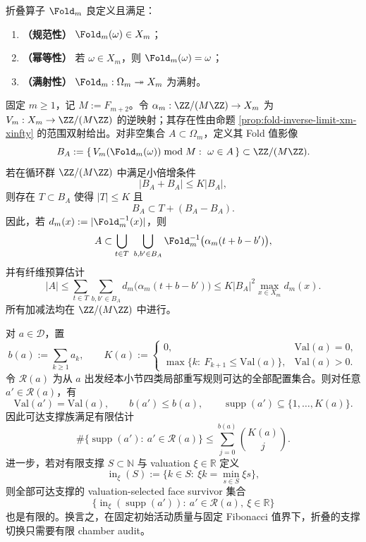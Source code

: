 \begin{proposition}\label{prop:fold-basic}
折叠算子 $\Fold_m$ 良定义且满足：
\begin{enumerate}
\normalfont
  \item \textbf{（规范性）} $\Fold_m(\omega)\in X_m$；
  \item \textbf{（幂等性）} 若 $\omega\in X_m$，则 $\Fold_m(\omega)=\omega$；
  \item \textbf{（满射性）} $\Fold_m:\Omega_m\twoheadrightarrow X_m$ 为满射。
\end{enumerate}
\end{proposition}
\begin{proposition}\label{prop:distill-fold-ruzsa-fiber-atlas}
固定 \(m\geq 1\)，记 \(M:=F_{m+2}\)。令
\(
\alpha_m:\ZZ/(M\ZZ)\to X_m
\)
为 \(V_m:X_m\to \ZZ/(M\ZZ)\) 的逆映射；其存在性由命题 \ref{prop:fold-inverse-limit-xm-xinfty} 的范围双射给出。对非空集合 \(A\subset\Omega_m\)，定义其 Fold 值影像
\[
B_A:=\{\,V_m(\Fold_m(\omega))\bmod M:\ \omega\in A\,\}\subset\ZZ/(M\ZZ).
\]
若在循环群 \(\ZZ/(M\ZZ)\) 中满足小倍增条件
\[
|B_A+B_A|\leq K|B_A|,
\]
则存在 \(T\subset B_A\) 使得 \(|T|\leq K\) 且
\[
B_A\subset T+(B_A-B_A).
\]
因此，若 \(d_m(x):=|\Fold_m^{-1}(x)|\)，则
\[
A\subset
\bigcup_{t\in T}\ \bigcup_{b,b'\in B_A}
\Fold_m^{-1}\bigl(\alpha_m(t+b-b')\bigr),
\]
并有纤维预算估计
\[
|A|\leq
\sum_{t\in T}\sum_{b,b'\in B_A}
 d_m\bigl(\alpha_m(t+b-b')\bigr)
\leq K|B_A|^2\max_{x\in X_m}d_m(x).
\]
所有加减法均在 \(\ZZ/(M\ZZ)\) 中进行。
\end{proposition}
\begin{theorem}[折叠重写的活动支撑预算与有限面账本]\label{thm:distill-khovanskii-fold-active-support-finite-chamber}
对 \(a\in\mathcal D\)，置
\[
b(a):=\sum_{k\ge1}a_k,\qquad
K(a):=
\begin{cases}
0,&\mathrm{Val}(a)=0,\\
\max\{k:\ F_{k+1}\le \mathrm{Val}(a)\},&\mathrm{Val}(a)>0.
\end{cases}
\]
令 \(\mathcal R(a)\) 为从 \(a\) 出发经本小节四类局部重写规则可达的全部配置集合。则对任意 \(a'\in\mathcal R(a)\)，有
\[
\mathrm{Val}(a')=\mathrm{Val}(a),\qquad
b(a')\le b(a),\qquad
\operatorname{supp}(a')\subseteq\{1,\ldots,K(a)\}.
\]
因此可达支撑族满足有限估计
\[
\#\{\operatorname{supp}(a'):\ a'\in\mathcal R(a)\}
\le
\sum_{j=0}^{b(a)}\binom{K(a)}{j}.
\]
进一步，若对有限支撑 \(S\subset\mathbb N\) 与 valuation \(\xi\in\mathbb R\) 定义
\[
\operatorname{in}_\xi(S):=\{k\in S:\ \xi k=\min_{s\in S}\xi s\},
\]
则全部可达支撑的 valuation-selected face survivor 集合
\[
\{\operatorname{in}_\xi(\operatorname{supp}(a')):\ a'\in\mathcal R(a),\ \xi\in\mathbb R\}
\]
也是有限的。换言之，在固定初始活动质量与固定 Fibonacci 值界下，折叠的支撑切换只需要有限 chamber audit。
\end{theorem}
